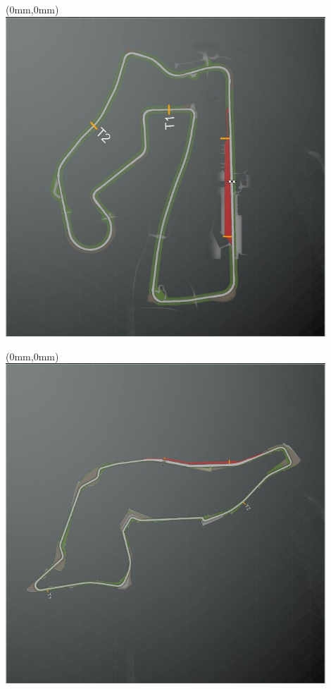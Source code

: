 \null\newpage
\begin{textblock*}{30mm}(0mm,0mm)%
\includegraphics[width=120mm]{TR/2015-05-20_00051.png}
\end{textblock*}
\null\newpage
\begin{textblock*}{30mm}(0mm,0mm)%
\includegraphics[width=120mm]{TR/2015-05-20_00030.png}
\end{textblock*}
